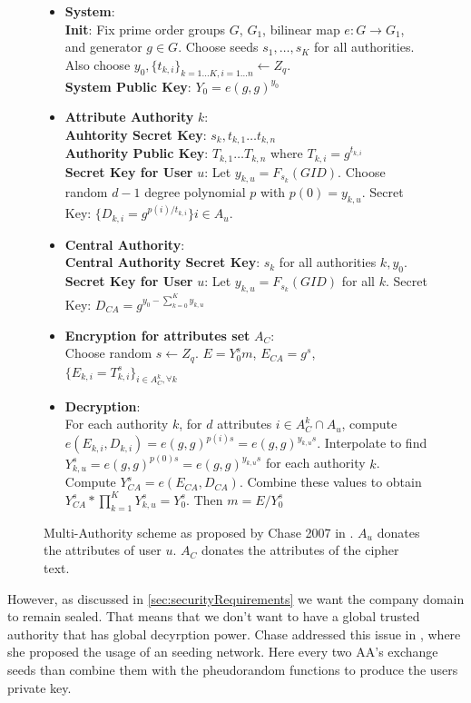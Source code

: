 \documentclass[twocolumn]{article}
\begin{document}
\begin{figure}[!ht]
\begin{itemize}
	\item \textbf{System}:\\
	\textbf{Init}: Fix prime order groups $G$, $G_1$, bilinear map $e: G \rightarrow G_1$, and generator $g \in G$. Choose seeds $s_1, \dots, s_K$ for all authorities. Also choose $y_0 , \{t_{k,i}\}_{k=1...K,i=1\dots n} \leftarrow Z_q$. \\
	\textbf{System Public Key}: $Y_0 = e(g, g)^{y_0}$
	\item \textbf{Attribute Authority} $k$: \\
	\textbf{Auhtority Secret Key}: $s_k, t_{k, 1} \dots t_{k,n} $ \\
	\textbf{Authority Public Key}: $ T_{k, 1} \dots T_{k, n}$ where $T_{k, i} = g^{t_{k,i}} $\\
	\textbf{Secret Key for User } $u$: Let $y_{k,u} = F_{s_k}(GID)$. Choose random $d - 1$ degree polynomial $p$ with $p(0) = y_{k,u}$. Secret Key: $\{D_{k,i} = g^{p(i)/t_{k,i}} \}i \in A_u $.
	\item \textbf{Central Authority}:\\
	\textbf{Central Authority Secret Key}: $s_k$ for all authorities $k, y_0$.  \\
	\textbf{Secret Key for User} $u$: Let $y_{k,u} = F_{s_k}(GID)$ for all $k$. Secret Key: $D_{CA} = g^{y_0 - \sum^K_{k=0} y_{k,u}}$
	\item \textbf{Encryption for attributes set } $A_C$: \\
	Choose random $s \leftarrow Z_q$. $E = Y_0^s m$, $E_{CA} = g^s$, $\{E_{k,i} = T^s_{k,i}\}_{i \in A^k_C, \forall k}$
	\item \textbf{Decryption}:\\
	For each authority $k$, for $d$ attributes $i \in A^k_C \cap A_u$, compute $e(E_{k,i}, D_{k,i}) = e(g,g)^{p(i)s} = e(g,g)^{y_{k,u}s}$.  Interpolate to find $Y^s_{k,u} = e(g, g)^{p(0)s} = e(g,g)^{y_{k,u}s}$ for each authority $k$. Compute $Y^s_{CA} = e(E_{CA} , D_{CA})$. Combine these values to obtain $Y^s_{CA} * \prod^K_{k=1} Y^s_{k,u} = Y^s_0$. Then $m = E/Y_0^s$
\end{itemize}
\caption{Multi-Authority scheme as proposed by Chase 2007 in \cite{chase2007multi}. $A_u$ donates the attributes of user $u$. $A_C$ donates the attributes of the cipher text.}
\label{fig:chase-multi-auth}
\end{figure}


However, as discussed in \ref{sec:securityRequirements} we want the company domain to remain sealed. That means that we don't want to have a global trusted authority that has global decyrption power. 
Chase addressed this issue in \cite{chase2009improving}, where she proposed the usage of an seeding network. Here every two AA's exchange seeds than combine them with the pheudorandom functions to produce the users private key. 
\end{document}
